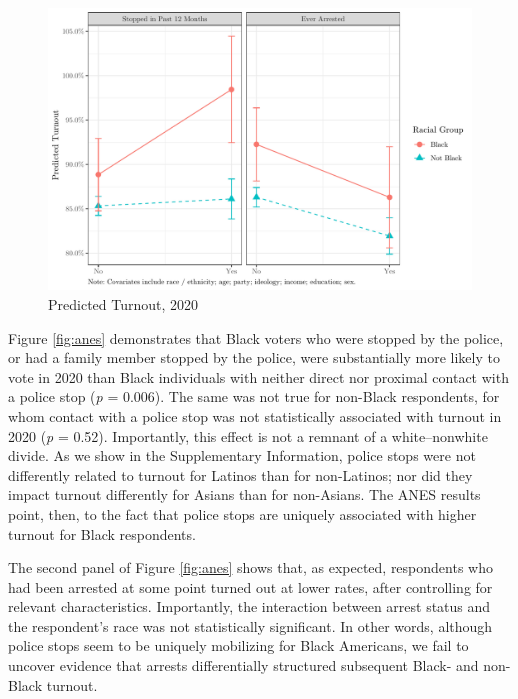 \documentclass[
  12pt,
]{article}
\begin{document}
\begin{figure}[!htpb]

{\centering \includegraphics{draft_paper_files/figure-latex/anes-cross-1} 

}

\caption{\label{fig:anes}Predicted Turnout, 2020}\label{fig:anes-cross}
\end{figure}

Figure \ref{fig:anes} demonstrates that Black voters who were stopped by the police, or had a family member stopped by the police, were substantially more likely to vote in 2020 than Black individuals with neither direct nor proximal contact with a police stop (\emph{p} = 0.006). The same was not true for non-Black respondents, for whom contact with a police stop was not statistically associated with turnout in 2020 (\emph{p} = 0.52). Importantly, this effect is not a remnant of a white--nonwhite divide. As we show in the Supplementary Information, police stops were not differently related to turnout for Latinos than for non-Latinos; nor did they impact turnout differently for Asians than for non-Asians. The ANES results point, then, to the fact that police stops are uniquely associated with higher turnout for Black respondents.

The second panel of Figure \ref{fig:anes} shows that, as expected, respondents who had been arrested at some point turned out at lower rates, after controlling for relevant characteristics. Importantly, the interaction between arrest status and the respondent's race was not statistically significant. In other words, although police stops seem to be uniquely mobilizing for Black Americans, we fail to uncover evidence that arrests differentially structured subsequent Black- and non-Black turnout.
\end{document}
